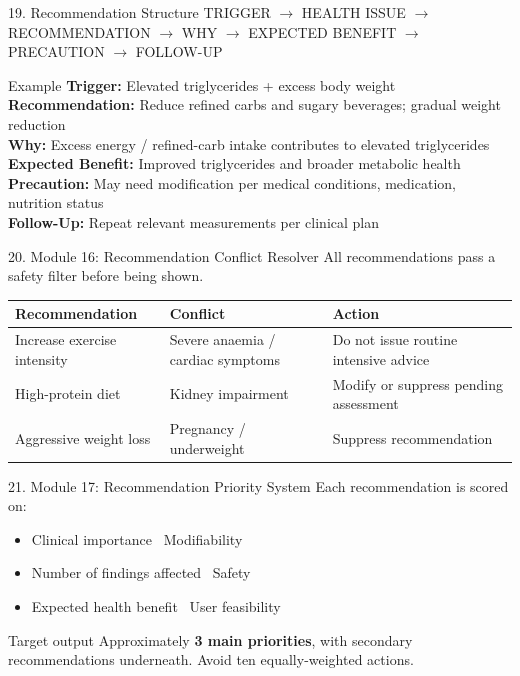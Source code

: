\documentclass[10pt,aspectratio=169]{beamer}
\begin{document}
\begin{frame}{19. Recommendation Structure}
\scriptsize
TRIGGER $\to$ HEALTH ISSUE $\to$ RECOMMENDATION $\to$ WHY $\to$ EXPECTED BENEFIT $\to$ PRECAUTION $\to$ FOLLOW-UP
\vspace{6pt}
\begin{exampleblock}{Example}
\scriptsize
\textbf{Trigger:} Elevated triglycerides + excess body weight \\
\textbf{Recommendation:} Reduce refined carbs and sugary beverages; gradual weight reduction \\
\textbf{Why:} Excess energy / refined-carb intake contributes to elevated triglycerides \\
\textbf{Expected Benefit:} Improved triglycerides and broader metabolic health \\
\textbf{Precaution:} May need modification per medical conditions, medication, nutrition status \\
\textbf{Follow-Up:} Repeat relevant measurements per clinical plan
\end{exampleblock}
\end{frame}

\begin{frame}{20. Module 16: Recommendation Conflict Resolver}
All recommendations pass a safety filter before being shown.
\vspace{6pt}
\scriptsize
\begin{center}
\begin{tabular}{p{3.6cm}p{3.6cm}p{3.6cm}}
\toprule
Recommendation & Conflict & Action \\
\midrule
Increase exercise intensity & Severe anaemia / cardiac symptoms & Do not issue routine intensive advice \\
High-protein diet & Kidney impairment & Modify or suppress pending assessment \\
Aggressive weight loss & Pregnancy / underweight & Suppress recommendation \\
\bottomrule
\end{tabular}
\end{center}
\end{frame}

\begin{frame}{21. Module 17: Recommendation Priority System}
Each recommendation is scored on:
\begin{itemize}
\item Clinical importance \quad \textbullet\ Modifiability
\item Number of findings affected \quad \textbullet\ Safety
\item Expected health benefit \quad \textbullet\ User feasibility
\end{itemize}
\vfill
\begin{alertblock}{Target output}
Approximately \textbf{3 main priorities}, with secondary recommendations underneath. Avoid ten equally-weighted actions.
\end{alertblock}
\end{frame}
\end{document}
